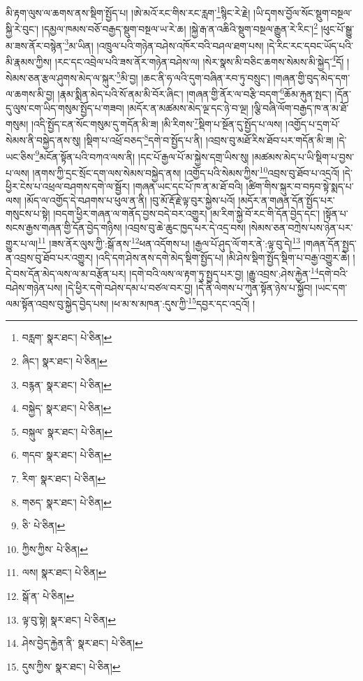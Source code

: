 མི་རྟག་ལུས་ལ་ཆགས་ནས་སྡིག་སྤྱོད་པ། །ཨེ་མའོ་རང་གིས་རང་རླག་\footnote{བརླག་  སྣར་ཐང་།  པེ་ཅིན། }སྙིང་རེ་རྗེ། །ཡི་དྭགས་བྱོལ་སོང་སྡུག་བསྔལ་སྐྱི་རེ་བུང་། །དམྱལ་ཁམས་བཅོ་བརྒྱད་སྡུག་བསྔལ་ཡ་རེ་ཆ། །སྐྱེ་རྒ་ན་འཆིའི་སྡུག་བསྔལ་རྒྱུན་རེ་རིང་།\footnote{ཞིང་།  སྣར་ཐང་།  པེ་ཅིན། } །ཕུང་པོ་སྒྱུ་མ་ཟས་ནོར་བསྙེན་\footnote{བརྙན་  སྣར་ཐང་།  པེ་ཅིན། }མ་ཡིན། །འཁྲུལ་པའི་གཉེན་བཤེས་འཁོར་བའི་བཤལ་ཐག་པས། །དེ་རིང་རང་དབང་ཡོད་པའི་མི་རྣམས་ཀྱིས། །རང་དང་འབྲེལ་པའི་ཟས་ནོར་གཉེན་བཤེས་ལ། །སེར་སྣས་མི་བཅིང་ཆགས་སེམས་མི་སྐྱེད་\footnote{བསྐྱེད་  སྣར་ཐང་།  པེ་ཅིན། }དོ། །སེམས་ཅན་རྩལ་ཤུགས་མེད་ལ་སྐུར་\footnote{བསྐུལ་  སྣར་ཐང་།  པེ་ཅིན། }མི་བྱ། །ཆང་ནི་ཧ་ལའི་དུག་བཞིན་རབ་ཏུ་བསྲུང་། །གཞན་གྱི་བུད་མེད་དག་ལ་ཆགས་མི་བྱ། །རྣམ་སྨིན་མེད་པའི་སོ་ནམ་མི་བོར་ཞིང་། །གཞན་གྱི་ནོར་ལ་བརྩི་བདག་\footnote{གདབ་  སྣར་ཐང་།  པེ་ཅིན། }ཆོམ་རྐུན་སྤང་། །དོན་དུ་ལུས་ངག་ཡིད་གསུམ་སྤྱོད་པ་གཟབ། །མདོར་ན་མཚམས་མེད་ལྔ་དང་ཉེ་བ་ལྔ། །ལྕི་བཞི་ལོག་བརྒྱད་ཁ་ན་མ་ཐོ་གསུམ། །འདི་སྤྱོད་ངན་སོང་གསུམ་དུ་གདོན་མི་ཟ། །མི་རིགས་\footnote{རིག་  སྣར་ཐང་།  པེ་ཅིན། }སྡིག་པ་སྔོན་དུ་སྤྱོད་པ་ལས། །འགྱོད་པ་དྲག་པོ་སེམས་ནི་བསྐྱེད་ནས་སུ། །སྡིག་པ་འཕྲོ་བཅད་\footnote{གཅད་  སྣར་ཐང་།  པེ་ཅིན། }དགེ་བ་སྤྱོད་པ་ནི། །འབྲས་བུ་མཐོ་རིས་ཐོབ་པར་གདོན་མི་ཟ། །དེ་ཡང་ཅིས་\footnote{ཅི་  པེ་ཅིན། }མངོན་སྟོན་པའི་བཀའ་ལས་ནི། །དང་པོ་རྒྱལ་པོ་མ་སྐྱེས་དགྲ་ཡིས་སུ། །མཚམས་མེད་པ་ཡི་སྡིག་པ་བྱས་པ་ལས། །ནགས་ཀྱི་དྲང་སྲོང་དག་ལས་སེམས་བསྐྱེད་ནས། །འགྱོད་པའི་སེམས་ཀྱིས་\footnote{ཀྱིས་ཀྱིས་  པེ་ཅིན། }འབྲས་བུ་ཐོབ་པ་འདྲའོ། །དེ་ཕྱིར་ངེས་པ་འཕྲལ་བཤགས་དགེ་ལ་སྦྱོར། །གཞན་ཡང་དང་པོ་ཁ་ན་མ་ཐོ་བའི། །ཚིག་གིས་སྐུར་བ་བཏབ་སྟེ་སྨད་པ་ལས། །མོད་ལ་འགྱོད་དེ་བཤགས་པ་ཕུལ་ན་ནི། །བུ་མོ་རྡོ་རྗེ་ལྟ་བུར་སྐྱེས་པའོ། །མདོར་ན་གཞན་དོན་སྤྱོད་པར་གསུངས་པ་སྟེ། །བདག་ཕྱིར་གཞན་ལ་གནོད་བྱས་བདེ་བར་འགྱུར། །མ་རིག་སྐྱེ་བོ་རང་གི་དོན་བྱེད་དང་། །སྟོན་པ་སངས་རྒྱས་གཞན་གྱི་དོན་བྱེད་གཉིས། །འབྲས་བུ་ཆེ་ཆུང་ཁྱད་པར་དེ་འདྲ་བས། །སེམས་ཅན་བཀྲེས་པས་ཉེན་པར་གྱུར་པ་ལ།\footnote{ལས།  སྣར་ཐང་།  པེ་ཅིན། } །ཟས་ནོར་ལུས་ཀྱི་:སྒོ་ནས་\footnote{སྒོ་ན་  པེ་ཅིན། }ཕན་འདོགས་པ། །རྒྱལ་པོ་ཤུད་ལོ་གར་ནེ་:ལྟ་བུ་དེ།\footnote{ལྟ་བུ་སྟེ།  སྣར་ཐང་།  པེ་ཅིན། } །གཞན་དོན་སྤྱད་ན་འབྲས་བུ་ཐོབ་པར་འགྱུར། །འདི་དག་ཤེས་ནས་དགེ་མེད་སྡིག་སྤྱོད་པ། །མི་ཤེས་སྡིག་སྤྱོད་སྡིག་པ་བརྒྱ་འགྱུར་ཆེ། །དེ་བས་དོན་མེད་ལས་ལ་མ་བརྩོན་པར། །དགེ་བའི་ལས་ལ་རྟག་ཏུ་སྤྱད་པར་བྱ། །རྒྱུ་འབྲས་:ཤེས་རྐྱེན་\footnote{ཤེས་བྱེད་རྐྱེན་ནི་  སྣར་ཐང་།  པེ་ཅིན། }དགེ་བའི་བཤེས་གཉེན་པས། །དེ་ཕྱིར་དགེ་བཤེས་དམ་པ་བཙལ་བར་བྱ། །དེ་ནི་ལེགས་པ་ཀུན་སྟོན་ཉེས་པ་སྐྱོབ། །ཡང་དག་ལམ་སྟོན་འབྲས་བུ་སྐྱེད་བྱེད་པས། །ཕ་མ་ས་མཁན་:དུས་ཀྱི་\footnote{དུས་ཀྱིས་  སྣར་ཐང་།  པེ་ཅིན། }དབྱར་དང་འདྲའོ། །
